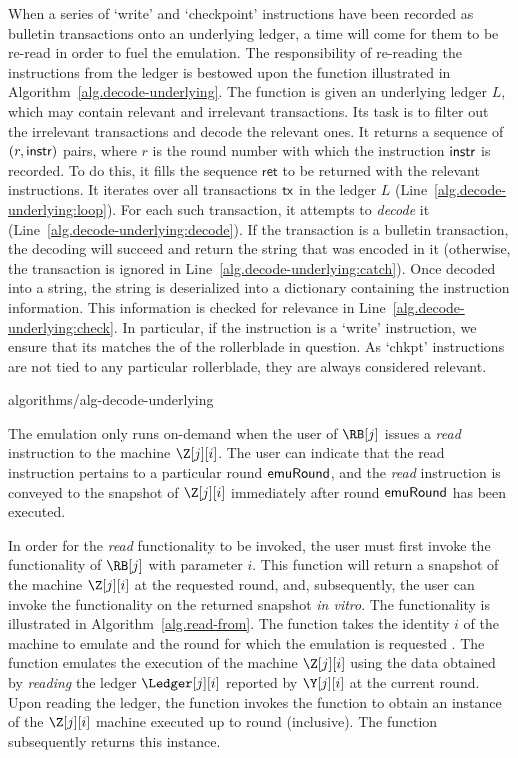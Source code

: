 When a series of `write' and `checkpoint' instructions have been recorded as bulletin
transactions onto an underlying ledger, a time will come for them to be re-read in order to fuel
the emulation. The responsibility of re-reading the instructions from the ledger is
bestowed upon the function \decodeUnderlying illustrated in
Algorithm~\ref{alg.decode-underlying}. The function is given an underlying ledger $L$,
which may contain relevant and irrelevant transactions.
Its task is to filter out the irrelevant transactions and decode the relevant ones.
It returns a sequence of $(r, \textsf{instr})$ pairs, where $r$ is the round number
with which the instruction $\textsf{instr}$ is recorded.
To do this, it fills the sequence $\textsf{ret}$ to be returned with the
relevant instructions. It iterates over all transactions $\textsf{tx}$ in the ledger $L$
(Line~\ref{alg.decode-underlying:loop}). For each such transaction, it attempts
to \emph{decode} it (Line~\ref{alg.decode-underlying:decode}). If the transaction
is a bulletin transaction, the decoding will succeed and return the string that
was encoded in it (otherwise, the transaction is ignored in
Line~\ref{alg.decode-underlying:catch}). Once decoded into a string, the string
is deserialized into a dictionary containing the instruction information. This
information is checked for relevance in Line~\ref{alg.decode-underlying:check}.
In particular, if the instruction is a `write' instruction, we ensure that its
\sid matches the \sid of the rollerblade in question. As `chkpt' instructions
are not tied to any particular rollerblade, they are always considered relevant.

{algorithms/alg-decode-underlying}

The emulation only runs
on-demand when the user of $\RB[j]$ issues a \emph{read} instruction to the machine
$\Z[j][i]$. The user can indicate that the read instruction pertains to a particular
round $\textsf{emuRound}$, and the \emph{read} instruction is conveyed to the snapshot
of $\Z[j][i]$ immediately after round $\textsf{emuRound}$ has been executed.

In order for the \emph{read} functionality to be invoked, the user must first
invoke the \emulationSnapshot functionality of $\RB[j]$ with parameter $i$.
This function will return a snapshot of the machine $\Z[j][i]$ at the requested
round, and, subsequently, the user can invoke the \lread functionality on
the returned snapshot \emph{in vitro}.
The \emulationSnapshot functionality is illustrated in Algorithm~\ref{alg.read-from}.
The \emulationSnapshot function takes the identity $i$ of the machine to emulate
and the round for which the emulation is requested
\emulationRound.
The \emulationSnapshot function emulates the execution of the machine
$\Z[j][i]$ using the data obtained by \emph{reading} the ledger $\Ledger[j][i]$
reported by $\Y[j][i]$ at the current round. Upon reading the ledger,
the \emulationSnapshot function invokes the \emulate function to obtain an instance
of the $\Z[j][i]$ machine executed up to round \emulationRound (inclusive).
The \emulationSnapshot function subsequently returns this instance.

